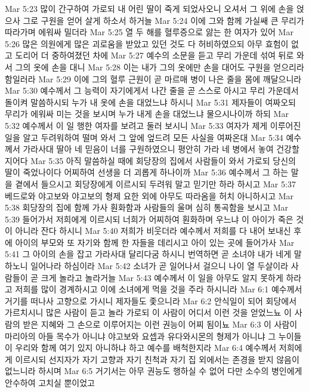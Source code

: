 Mar 5:23  많이 간구하여 가로되 내 어린 딸이 죽게 되었사오니 오셔서 그 위에 손을 얹으사 그로 구원을 얻어 살게 하소서 하거늘
Mar 5:24  이에 그와 함께 가실쌔 큰 무리가 따라가며 에워싸 밀더라
Mar 5:25  열 두 해를 혈루증으로 앓는 한 여자가 있어
Mar 5:26  많은 의원에게 많은 괴로움을 받았고 있던 것도 다 허비하였으되 아무 효험이 없고 도리어 더 중하여졌던 차에
Mar 5:27  예수의 소문을 듣고 무리 가운데 섞여 뒤로 와서 그의 옷에 손을 대니
Mar 5:28  이는 내가 그의 옷에만 손을 대어도 구원을 얻으리라 함일러라
Mar 5:29  이에 그의 혈루 근원이 곧 마르매 병이 나은 줄을 몸에 깨달으니라
Mar 5:30  예수께서 그 능력이 자기에게서 나간 줄을 곧 스스로 아시고 무리 가운데서 돌이켜 말씀하시되 누가 내 옷에 손을 대었느냐 하시니
Mar 5:31  제자들이 여짜오되 무리가 에워싸 미는 것을 보시며 누가 내게 손을 대었느냐 물으시나이까 하되
Mar 5:32  예수께서 이 일 행한 여자를 보려고 둘러 보시니
Mar 5:33  여자가 제게 이루어진 일을 알고 두려워하여 떨며 와서 그 앞에 엎드려 모든 사실을 여짜온대
Mar 5:34  예수께서 가라사대 딸아 네 믿음이 너를 구원하였으니 평안히 가라 네 병에서 놓여 건강할지어다
Mar 5:35  아직 말씀하실 때에 회당장의 집에서 사람들이 와서 가로되 당신의 딸이 죽었나이다 어찌하여 선생을 더 괴롭게 하나이까
Mar 5:36  예수께서 그 하는 말을 곁에서 들으시고 회당장에게 이르시되 두려워 말고 믿기만 하라 하시고
Mar 5:37  베드로와 야고보와 야고보의 형제 요한 외에 아무도 따라옴을 허치 아니하시고
Mar 5:38  회당장의 집에 함께 가사 훤화함과 사람들의 울며 심히 통곡함을 보시고
Mar 5:39  들어가서 저희에게 이르시되 너희가 어찌하여 훤화하며 우느냐 이 아이가 죽은 것이 아니라 잔다 하시니
Mar 5:40  저희가 비웃더라 예수께서 저희를 다 내어 보내신 후에 아이의 부모와 또 자기와 함께 한 자들을 데리시고 아이 있는 곳에 들어가사
Mar 5:41  그 아이의 손을 잡고 가라사대 달리다굼 하시니 번역하면 곧 소녀야 내가 네게 말하노니 일어나라 하심이라
Mar 5:42  소녀가 곧 일어나서 걸으니 나이 열 두살이라 사람들이 곧 크게 놀라고 놀라거늘
Mar 5:43  예수께서 이 일을 아무도 알지 못하게 하라고 저희를 많이 경계하시고 이에 소녀에게 먹을 것을 주라 하시니라
Mar 6:1  예수께서 거기를 떠나사 고향으로 가시니 제자들도 좇으니라
Mar 6:2  안식일이 되어 회당에서 가르치시니 많은 사람이 듣고 놀라 가로되 이 사람이 어디서 이런 것을 얻었느뇨 이 사람의 받은 지혜와 그 손으로 이루어지는 이런 권능이 어찌 됨이뇨
Mar 6:3  이 사람이 마리아의 아들 목수가 아니냐 야고보와 요셉과 유다와시몬의 형제가 아니냐 그 누이들이 우리와 함께 여기 있지 아니하냐 하고 예수를 배척한지라
Mar 6:4  예수께서 저희에게 이르시되 선지자가 자기 고향과 자기 친척과 자기 집 외에서는 존경을 받지 않음이 없느니라 하시며
Mar 6:5  거기서는 아무 권능도 행하실 수 없어 다만 소수의 병인에게 안수하여 고치실 뿐이었고
